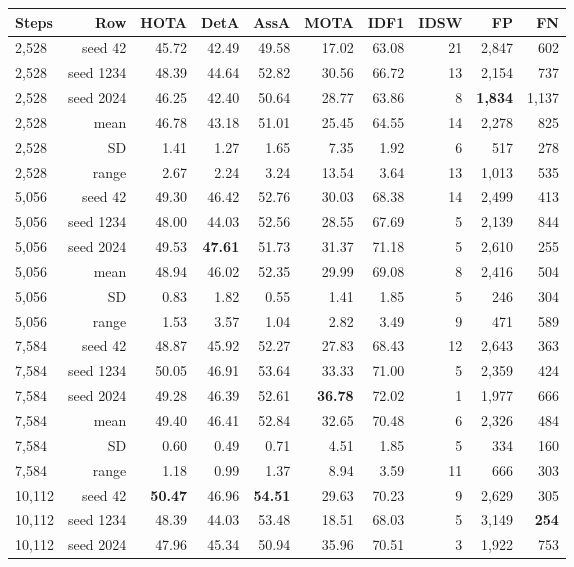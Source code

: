 \begin{tabular}{lrrrrrrrrr}
\toprule
Steps & Row & HOTA & DetA & AssA & MOTA & IDF1 & IDSW & FP & FN \\
\midrule
2,528 & seed 42 & 45.72 & 42.49 & 49.58 & 17.02 & 63.08 & 21 & 2,847 & 602 \\
2,528 & seed 1234 & 48.39 & 44.64 & 52.82 & 30.56 & 66.72 & 13 & 2,154 & 737 \\
2,528 & seed 2024 & 46.25 & 42.40 & 50.64 & 28.77 & 63.86 & 8 & \textbf{1,834} & 1,137 \\
2,528 & mean & 46.78 & 43.18 & 51.01 & 25.45 & 64.55 & 14 & 2,278 & 825 \\
2,528 & SD & 1.41 & 1.27 & 1.65 & 7.35 & 1.92 & 6 & 517 & 278 \\
2,528 & range & 2.67 & 2.24 & 3.24 & 13.54 & 3.64 & 13 & 1,013 & 535 \\
5,056 & seed 42 & 49.30 & 46.42 & 52.76 & 30.03 & 68.38 & 14 & 2,499 & 413 \\
5,056 & seed 1234 & 48.00 & 44.03 & 52.56 & 28.55 & 67.69 & 5 & 2,139 & 844 \\
5,056 & seed 2024 & 49.53 & \textbf{47.61} & 51.73 & 31.37 & 71.18 & 5 & 2,610 & 255 \\
5,056 & mean & 48.94 & 46.02 & 52.35 & 29.99 & 69.08 & 8 & 2,416 & 504 \\
5,056 & SD & 0.83 & 1.82 & 0.55 & 1.41 & 1.85 & 5 & 246 & 304 \\
5,056 & range & 1.53 & 3.57 & 1.04 & 2.82 & 3.49 & 9 & 471 & 589 \\
7,584 & seed 42 & 48.87 & 45.92 & 52.27 & 27.83 & 68.43 & 12 & 2,643 & 363 \\
7,584 & seed 1234 & 50.05 & 46.91 & 53.64 & 33.33 & 71.00 & 5 & 2,359 & 424 \\
7,584 & seed 2024 & 49.28 & 46.39 & 52.61 & \textbf{36.78} & 72.02 & 1 & 1,977 & 666 \\
7,584 & mean & 49.40 & 46.41 & 52.84 & 32.65 & 70.48 & 6 & 2,326 & 484 \\
7,584 & SD & 0.60 & 0.49 & 0.71 & 4.51 & 1.85 & 5 & 334 & 160 \\
7,584 & range & 1.18 & 0.99 & 1.37 & 8.94 & 3.59 & 11 & 666 & 303 \\
10,112 & seed 42 & \textbf{50.47} & 46.96 & \textbf{54.51} & 29.63 & 70.23 & 9 & 2,629 & 305 \\
10,112 & seed 1234 & 48.39 & 44.03 & 53.48 & 18.51 & 68.03 & 5 & 3,149 & \textbf{254} \\
10,112 & seed 2024 & 47.96 & 45.34 & 50.94 & 35.96 & 70.51 & 3 & 1,922 & 753 \\

\end{tabular}
